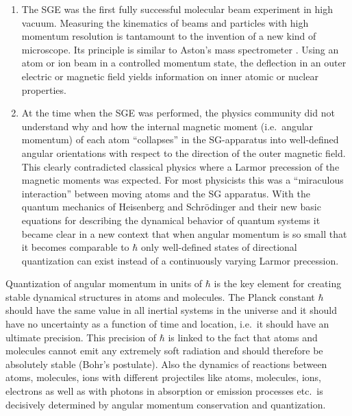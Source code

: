 \documentclass[12pt]{article}
\begin{document}
\begin{enumerate}
\item The SGE was the first fully successful molecular beam experiment in high vacuum. Measuring the kinematics of beams and particles with high momentum resolution is tantamount to the invention of a new kind of microscope. Its principle is similar to Aston's mass spectrometer \citep{AstonF1919Spectrograph}. Using an atom or ion beam in a controlled momentum state, the deflection in an outer electric or magnetic field yields information on inner atomic or nuclear properties. 
\item At the time when the SGE was performed, the physics community did not understand why and how the internal magnetic moment (i.e.\ angular momentum) of each atom ``collapses'' in the SG-apparatus into well-defined angular orientations with respect to the direction of the outer magnetic field. This clearly contradicted classical physics where a Larmor precession of the magnetic moments was expected. For most physicists this was a ``miraculous interaction'' between moving atoms and the SG apparatus. With the quantum mechanics of Heisenberg and Schrödinger 
and their new basic equations for describing the dynamical behavior of quantum systems it became clear in a new context that when angular momentum is so small that it becomes comparable to $\hbar$ only well-defined states of directional quantization can exist instead of a continuously varying Larmor precession.
\end{enumerate}

Quantization of angular momentum in units of $\hbar$ is the key element for creating stable dynamical structures in atoms and molecules. The Planck constant $\hbar$ should have the same value in all inertial systems in the universe and it should have no uncertainty as a function of time and location, i.e.\ it should have an ultimate precision. This precision of $\hbar$ is linked to the fact that atoms and molecules cannot emit any extremely soft radiation and should therefore be absolutely stable (Bohr's postulate). Also the dynamics of reactions between atoms, molecules, ions with different projectiles like atoms, molecules, ions, electrons as well as with photons in absorption or emission processes etc.\ is decisively determined by angular momentum conservation and quantization. 
\end{document}
